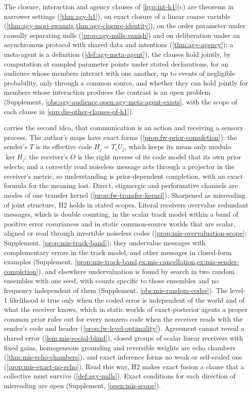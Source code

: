 The closure, interaction and agency clauses of \cref{hyp:int-h1}(c) are theorems in narrower settings (\cref{thm:agy-h1}), on exact closure of a linear coarse variable (\cref{thm:agy-mori-zwanzig,thm:agy-closure-identity}), on the order parameter under causally separating nulls (\cref{prop:agy-nulls-vanish}) and on deliberation under an asynchronous protocol with shared data and intentions (\cref{thm:agy-agency}); a meta-agent is a definition (\cref{def:agy-meta-agent}), the clauses hold jointly, by computation at sampled parameter points under stated declarations, for an audience whose members interact with one another, up to events of negligible probability, only through a common source, and whether they can hold jointly for members whose interaction produces the contrast is an open problem (Supplement, \cref{obs:agy-audience,open:agy-meta-agent-exists}, with the scope of each clause in \cref{sup:dis-other-clauses-of-h1}).

 carries the second idea, that communication is an action and receiving a sensory process. The author's maps have exact forms (\cref{prop:fw-prior-completion}): the sender's $T$ is its effective code $H_j=T_cU_j$, which keeps its mean only modulo $\ker H_j$; the receiver's $O$ is the right inverse of its code model that its own prior selects; and a correctly read noiseless message acts through a projector in the receiver's metric, so understanding is prior-dependent completion, with an exact formula for the meaning lost. Direct, stigmergic and performative channels are modes of one transfer kernel (\cref{prop:fw-transfer-kernel}). Sharpened as misreading of joint structure, H2 holds in stated scopes. Literal receivers overvalue redundant messages, which is double counting, in the scalar track model within a band of positive error covariances and in static common-source worlds that are scalar, aligned or read through invertible noiseless codes (\cref{prop:mis-overvaluation-scope}; Supplement, \cref{prop:mis-track-band}); they undervalue messages with complementary errors in the track model, and other messages in closed-form examples (Supplement, \cref{prop:mis-track-band,ex:mis-cancellation,ex:mis-sender-completion}), and elsewhere undervaluation is found by search in two random ensembles with one seed, with counts specific to those ensembles and no frequency independent of them (Supplement, \cref{obs:mis-random-codes}). The level-1 likelihood is true only when the coded error is independent of the world and of what the receiver knows, which in static worlds of exact-posterior agents a proper common prior rules out for every nonzero code when the receiver reads with the sender's code and header (\cref{prop:fw-level-optimality}). Agreement cannot reveal a shared error (\cref{lem:mis-social-blind}), closed groups of scalar linear receivers with fixed gains, homogeneous grounding and reversible weights are echo chambers (\cref{thm:mis-echo-chambers}), and exact inference forms no weak or self-sealed one (\cref{prop:mis-exact-no-echo}). Read this way, H2 makes exact fusion a clause that a collective must survive (\cref{def:agy-nulls}). Exact conditions for each direction of misreading are open (Supplement, \cref{open:mis-scope}).

